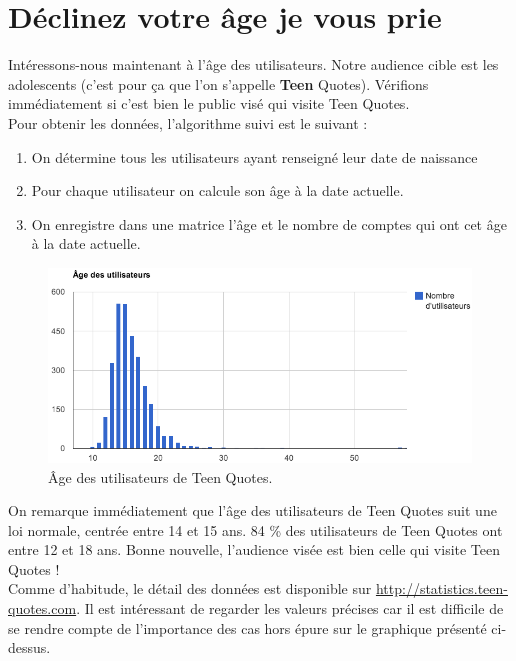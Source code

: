 \documentclass{report}
\begin{document}
	\section{Déclinez votre âge je vous prie}
	Intéressons-nous maintenant à l'âge des utilisateurs. Notre audience cible est les adolescents (c'est pour ça que l'on s'appelle \textbf{Teen} Quotes). Vérifions immédiatement si c'est bien le public visé qui visite Teen Quotes.\\

	Pour obtenir les données, l'algorithme suivi est le suivant :
	\vspace{10px}
	\begin{enumerate}
		\item On détermine tous les utilisateurs ayant renseigné leur date de naissance
		\item Pour chaque utilisateur on calcule son âge à la date actuelle.
		\item On enregistre dans une matrice l'âge et le nombre de comptes qui ont cet âge à la date actuelle.
	\end{enumerate}
	\vspace{10px}
	\begin{figure}[H]
		\center
		\includegraphics[width=450px]{images/ageUtilisateurs.png}
		\caption{Âge des utilisateurs de Teen Quotes.}
	\end{figure}
	On remarque immédiatement que l'âge des utilisateurs de Teen Quotes suit une loi normale, centrée entre 14 et 15 ans. 84 \% des utilisateurs de Teen Quotes ont entre 12 et 18 ans. Bonne nouvelle, l'audience visée est bien celle qui visite Teen Quotes !\\

	Comme d'habitude, le détail des données est disponible sur \url{http://statistics.teen-quotes.com}. Il est intéressant de regarder les valeurs précises car il est difficile de se rendre compte de l'importance des cas hors épure sur le graphique présenté ci-dessus.
\end{document}
